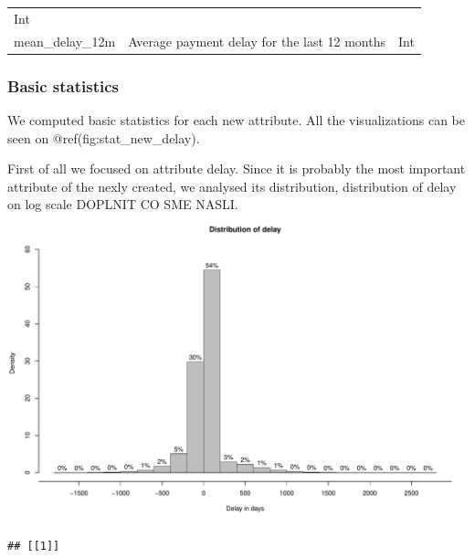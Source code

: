 \documentclass[
]{article}
\begin{document}
\begin{longtable}[]{@{}lll@{}}
\begin{minipage}[t]{0.30\columnwidth}
Int\strut
\end{minipage}\tabularnewline
\begin{minipage}[t]{0.30\columnwidth}\raggedright
mean\_delay\_12m\strut
\end{minipage} & \begin{minipage}[t]{0.30\columnwidth}\raggedright
Average payment delay for the last 12 months\strut
\end{minipage} & \begin{minipage}[t]{0.30\columnwidth}\raggedright
Int\strut
\end{minipage}\tabularnewline
\bottomrule
\end{longtable}

\hypertarget{basic-statistics-1}{%
\subsubsection{Basic statistics}\label{basic-statistics-1}}

We computed basic statistics for each new attribute.
All the visualizations can be seen on @ref(fig:stat\_new\_delay).

First of all we focused on attribute delay. Since it is probably the most important attribute of the nexly created, we analysed its distribution, distribution of delay on log scale DOPLNIT CO SME NASLI.
\includegraphics{Documentation_Rmarkdown_files/figure-latex/stat_new_delay-1.pdf}

\begin{verbatim}
## [[1]]
\end{verbatim}
\end{document}

